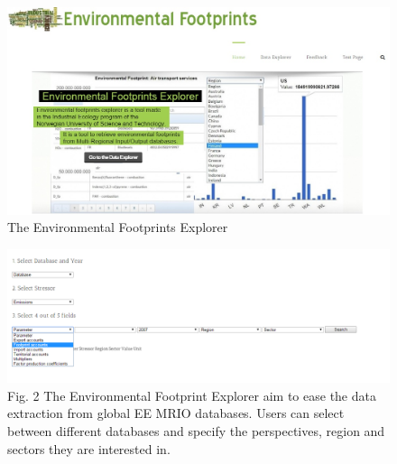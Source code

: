 \documentclass[12pt,letterpaper]{report}
\title{}
\begin{document}
\maketitle







\begin{figure}[h!]
\centering
\includegraphics[width=1.0\columnwidth]{figures/web1/web1.jpg}
\label{fig:startpage} The Environmental Footprints Explorer 
\end{figure}















\begin{figure}[h!]
\centering
\includegraphics[width=1.0\columnwidth]{figures/mrioweb/mrioweb.png}
Fig. 2 The Environmental Footprint Explorer aim to ease the data extraction from global EE MRIO databases. Users can select between different databases and specify the perspectives, region and sectors they are interested in.
\end{figure}






\end{document}
